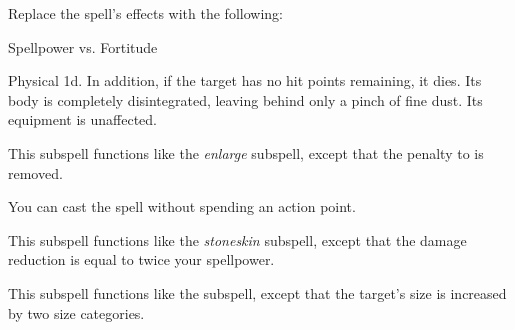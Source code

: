 Replace the spell's effects with the following:
\begin{spellcontent}

\begin{augmenteffects}




\begin{spellattack}{Spellpower vs. Fortitude}


\hit
Physical  \plus1d.
In addition, if the target has no hit points remaining, it dies.
Its body is completely disintegrated, leaving behind only a pinch of fine dust.
Its equipment is unaffected.



\end{spellattack}





\end{augmenteffects}

\end{spellcontent}






This subspell functions like the \textit{enlarge} subspell, except that the penalty to  is removed.






You can cast the spell without spending an action point.






This subspell functions like the \textit{stoneskin} subspell, except that the damage reduction is equal to twice your spellpower.







This subspell functions like the  subspell, except that the target's size is increased by two size categories.





